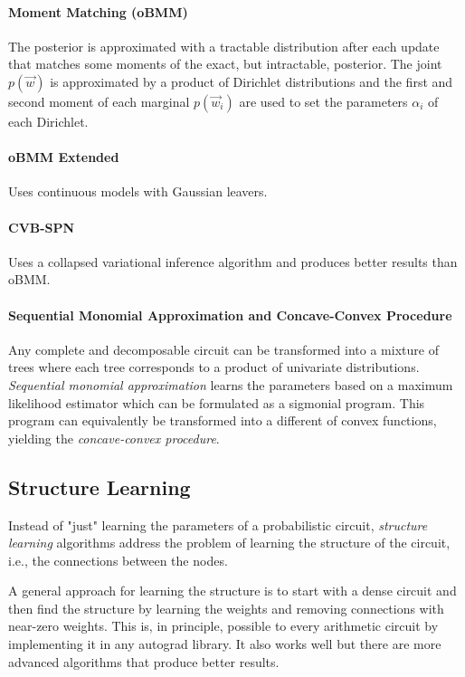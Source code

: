 				\paragraph{Moment Matching (oBMM)}
					The posterior is approximated with a tractable distribution after each update that matches some moments of the exact, but intractable, posterior. The joint \(p(\vec{w})\) is approximated by a product of Dirichlet distributions and the first and second moment of each marginal \(p(\vec{w}_i)\) are used to set the parameters \(\alpha_i\) of each Dirichlet.

				\paragraph{oBMM Extended}
					Uses continuous models with Gaussian leavers.

				\paragraph{CVB-SPN}
					Uses a collapsed variational inference algorithm and produces better results than oBMM.

				\paragraph{Sequential Monomial Approximation and Concave-Convex Procedure}
					Any complete and decomposable circuit can be transformed into a mixture of trees where each tree corresponds to a product of univariate distributions. \emph{Sequential monomial approximation} learns the parameters based on a maximum likelihood estimator which can be formulated as a sigmonial program. This program can equivalently be transformed into a different of convex functions, yielding the \emph{concave-convex procedure}.

		\subsection{Structure Learning}
			Instead of "just" learning the parameters of a probabilistic circuit, \emph{structure learning} algorithms address the problem of learning the structure of the circuit, i.e., the connections between the nodes.

			A general approach for learning the structure is to start with a dense circuit and then find the structure by learning the weights and removing connections with near-zero weights. This is, in principle, possible to every arithmetic circuit by implementing it in any autograd library. It also works well but there are more advanced algorithms that produce better results.

